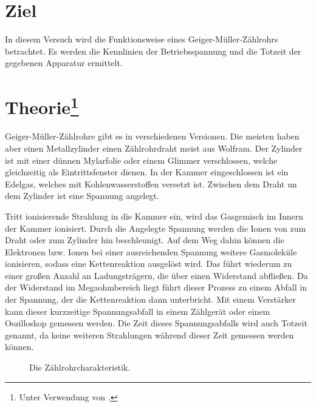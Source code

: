 \section{Ziel}
In diesem Versuch wird die Funktionsweise eines Geiger-Müller-Zählrohrs betrachtet.
Es werden die Kennlinien der Betriebsspannung und die Totzeit der gegebenen Apparatur ermittelt.

\section[Theorie]{Theorie\footnote[1]{Unter Verwendung von \cite{man:v703}.}}
Geiger-Müller-Zählrohre gibt es in verschiedenen Versionen.
Die meisten haben aber einen Metallzylinder einen Zählrohrdraht meist aus Wolfram. 
Der Zylinder ist mit einer dünnen Mylarfolie oder einem Glimmer verschlossen, welche gleichzeitig als
Eintrittsfenster dienen.
In der Kammer eingeschlossen ist ein Edelgas, welches mit Kohlenwasserstoffen versetzt ist.
Zwischen dem Draht un dem Zylinder ist eine Spannung angelegt.

Tritt ionisierende Strahlung in die Kammer ein, wird das Gasgemisch im Innern der Kammer ionisiert.
Durch die Angelegte Spannung werden die Ionen von zum Draht oder zum Zylinder hin beschleunigt.
Auf dem Weg dahin können die Elektronen bzw. Ionen bei einer ausreichenden Spannung weitere Gasmoleküle ionisieren, sodass eine Kettenreaktion ausgelöst wird.
Das führt wiederum zu einer großen Anzahl an Ladungsträgern, die über einen Widerstand abfließen.
Da der Widerstand im Megaohmbereich liegt führt dieser Prozess zu einem Abfall in der Spannung, der die Kettenreaktion dann unterbricht.
Mit einem Verstärker kann dieser kurzzeitige Spannungsabfall in einem Zählgerät oder einem Oszilloskop gemessen werden.
Die Zeit dieses Spannungsabfalls wird auch Totzeit genannt, da keine weiteren Strahlungen während dieser Zeit gemessen werden können.


\begin{figure}
    \centering
    
    \caption{Die Zählrohrcharakteristik.}
    \label{fig:02_teo}
\end{figure}

